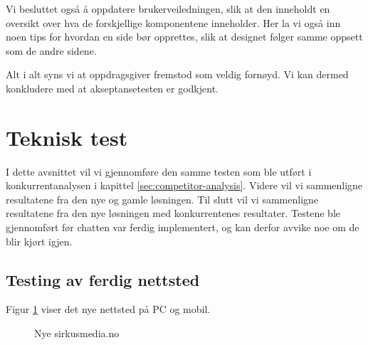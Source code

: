 Vi besluttet også å oppdatere brukerveiledningen, slik at den inneholdt en oversikt over hva de forskjellige komponentene inneholder. Her la vi også inn noen tips for hvordan en side bør opprettes, slik at designet følger samme oppsett som de andre sidene.

Alt i alt syns vi at oppdragsgiver fremstod som veldig fornøyd. Vi kan dermed konkludere med at akseptansetesten er godkjent.

\section{Teknisk test}
I dette avsnittet vil vi gjennomføre den samme testen som ble utført i konkurrentanalysen i kapittel \ref{sec:competitor-analysis}. Videre vil vi sammenligne resultatene fra den nye og gamle løsningen. Til slutt vil vi sammenligne resultatene fra den nye løsningen med konkurrentenes resultater. Testene ble gjennomført før chatten var ferdig implementert, og kan derfor avvike noe om de blir kjørt igjen.

\subsection{Testing av ferdig nettsted}
Figur \ref{fig:analysis-new-website} viser det nye nettsted på PC og mobil.

\begin{figure}[H]
    \begin{center}
        \label{fig:analysis-new-website}
        \caption{Nye sirkusmedia.no}
    \end{center}
\end{figure}

